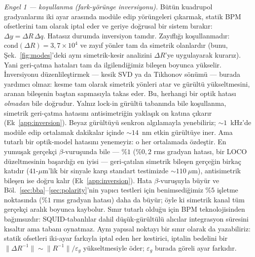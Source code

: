 \documentclass[aps,prab,reprint,superscriptaddress,nofootinbib]{revtex4-2}
\begin{document}
\emph{Engel 1 --- koşullanma (fark-yörünge inversiyonu).} Bütün kuadrupol
gradyanlarını iki ayar arasında modüle edip yörüngeleri çıkarmak, statik BPM
ofsetlerini tam olarak iptal eder ve geriye doğrusal bir sistem bırakır:
$\Delta y = \Delta R\,\Delta q$. Hatasız durumda inversiyon tamdır. Zayıflığı
koşullanmadır: $\mathrm{cond}(\Delta R) = 3{,}7\times10^{4}$ ve zayıf yönler tam da
simetrik olanlardır (bunu, Şek.~\ref{fig:modes}'deki aynı simetrik-kesir analizini
$\Delta R$'ye uygulayarak kurarız). Yani geri-çatma hataları tam da ilgilendiğimiz
bileşen boyunca yükselir. İnversiyonu düzenlileştirmek --- kesik SVD ya da Tikhonov
sönümü --- burada yardımcı olmaz: kesme tam olarak simetrik yönleri atar ve
gürültü yükseltmesini, aranan bileşenin baştan sapmasıyla takas eder. Bu, herhangi
bir optik hatası \emph{olmadan} bile doğrudur. Yalnız lock-in gürültü tabanında bile
koşullanma, simetrik geri-çatma hatasını antisimetriğin yaklaşık on katına çıkarır
(Ek~\ref{app:inversion}). Beyaz gürültüyü senkron algılamayla yenebiliriz;
$\sim\!1$~kHz'de modüle edip ortalamak dakikalar içinde $\sim\!14$~nm etkin gürültüye
iner. Ama tutarlı bir optik-model hatasını yenemeyiz: o her ortalamada özdeştir. En
yumuşak gerçekçi $\beta$-vuruşunda bile --- $\%1$ ($\%0{,}2$ rms gradyan hatası, bir
LOCO düzeltmesinin başardığı en iyisi --- geri-çatılan simetrik bileşen gerçeğin
birkaç katıdır ($41$-$\mu$m'lik bir sinyale karşı standart testimizde $\sim\!110~\mu$m),
antisimetrik bileşen ise doğru kalır (Ek~\ref{app:inversion}). Hata $\beta$-vuruşuyla
büyür ve Böl.~\ref{sec:bba}--\ref{sec:polarity}'nin yapıcı testleri için benimsediğimiz
$\%5$ işletme noktasında ($\%1$ rms gradyan hatası) daha da büyür; öyle ki simetrik
kanal tüm gerçekçi aralık boyunca kaybolur. Sınır tutarlı olduğu için BPM
teknolojisinden bağımsızdır: SQUID-tabanlılar dahil düşük-gürültülü alıcılar
integrasyon süresini kısaltır ama tabanı oynatmaz. Aynı yapısal noktayı bir sınır
olarak da yazabiliriz: statik ofsetleri iki-ayar farkıyla iptal eden her kestirici,
iptalin bedelini bir $\|\Delta R^{-1}\| \sim \|R^{-1}\|/\varepsilon_g$ yükseltmesiyle
öder; $\varepsilon_g$ burada göreli ayar farkıdır.
\end{document}
